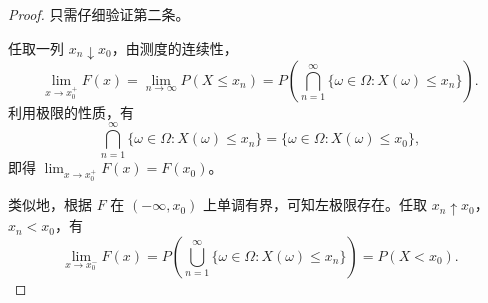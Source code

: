 \begin{proof}
只需仔细验证第二条。

任取一列 $x_n\downarrow x_0$，由测度的连续性，
\[
\lim_{x\to x_0^+}F(x)=\lim_{n\to\infty}P(X\leq x_n)
=P\left(\bigcap_{n=1}^{\infty}\{\omega\in\Omega:X(\omega)\leq x_n\}\right).
\]
利用极限的性质，有
\[
\bigcap_{n=1}^{\infty}\{\omega\in\Omega:X(\omega)\leq x_n\}
=\{\omega\in\Omega:X(\omega)\leq x_0\},
\]
即得 $\lim_{x\to x_0^+}F(x)=F(x_0)$。

类似地，根据 $F$ 在 $(-\infty,x_0)$ 上单调有界，可知左极限存在。任取 $x_n\uparrow x_0$，$x_n<x_0$，有
\[
\lim_{x\to x_0^-}F(x)
=P\left(\bigcup_{n=1}^{\infty}\{\omega\in\Omega:X(\omega)\leq x_n\}\right)
=P(X<x_0).
\]
\end{proof}

